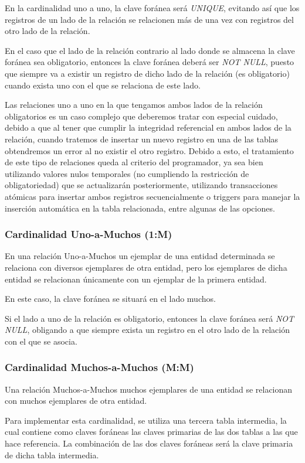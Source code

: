 En la cardinalidad uno a uno, la clave foránea será \textit{UNIQUE}, evitando así que los registros de un lado de la relación se relacionen más de una vez con registros del otro lado de la relación.

En el caso que el lado de la relación contrario al lado donde se almacena la clave foránea sea obligatorio, entonces la clave foránea deberá ser \textit{NOT NULL}, puesto que siempre va a existir un registro de dicho lado de la relación (es obligatorio) cuando exista uno con el que se relaciona de este lado.

Las relaciones uno a uno en la que tengamos ambos lados de la relación obligatorios es un caso complejo que deberemos tratar con especial cuidado, debido a que al tener que cumplir la integridad referencial en ambos lados de la relación, cuando tratemos de insertar un nuevo registro en una de las tablas obtendremos un error al no existir el otro registro. Debido a esto, el tratamiento de este tipo de relaciones queda al criterio del programador, ya sea bien utilizando valores nulos temporales (no cumpliendo la restricción de obligatoriedad) que se actualizarán posteriormente, utilizando transacciones atómicas para insertar ambos registros secuencialmente o triggers para manejar la inserción automática en la tabla relacionada, entre algunas de las opciones.

\subsubsection{Cardinalidad Uno-a-Muchos (1:M)}
En una relación Uno-a-Muchos un ejemplar de una entidad determinada se relaciona con diversos ejemplares de otra entidad, pero los ejemplares de dicha entidad se relacionan únicamente con un ejemplar de la primera entidad.

En este caso, la clave foránea se situará en el lado muchos.

Si el lado a uno de la relación es obligatorio, entonces la clave foránea será \textit{NOT NULL}, obligando a que siempre exista un registro en el otro lado de la relación con el que se asocia.

\subsubsection{Cardinalidad Muchos-a-Muchos (M:M)}
Una relación Muchos-a-Muchos muchos ejemplares de una entidad se relacionan con muchos ejemplares de otra entidad.

Para implementar esta cardinalidad, se utiliza una tercera tabla intermedia, la cual contiene como claves foráneas las claves primarias de las dos tablas a las que hace referencia. La combinación de las dos claves foráneas será la clave primaria de dicha tabla intermedia.